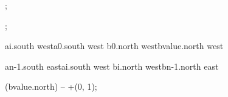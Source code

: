 ;


;

\bracetobrace
    {ai.south west}{a0.south west}
    {b0.north west}{bvalue.north west}

\bracetobrace
    {an-1.south east}{ai.south west}
    {bi.north west}{bn-1.north east}

 (bvalue.north) -- +(0, 1);

